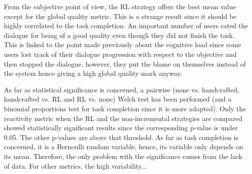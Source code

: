 	From the subjective point of view, the RL strategy offers the best mean value except for the global quality metric. This is a strange result since it should be highly correlated to the task completion. An important number of users rated the dialogue for being of a good quality even though they did not finish the task. This is linked to the point made previously about the cognitive load since some users lost track of their dialogue progression with respect to the objective and then stopped the dialogue, however, they put the blame on themselves instead of the system hence giving a high global quality mark anyway.
	
	As far as statistical significance is concerned, a pairwise (none vs. handcrafted, handcrafted vs. RL and RL vs. none) Welch test has been performed (and a binomial proportions test for task completion since it is more adapted). Only the reactivity metric when the RL and the non-incremental strategies are compared showed statistically significant results since the corresponding p-value is under 0.05. The other p-values are above that threshold. As far as task completion is concerned, it is a Bernoulli random variable, hence, its variable only depends on its mean. Therefore, the only problem with the significance comes from the lack of data. For other metrics, the high variability... 
